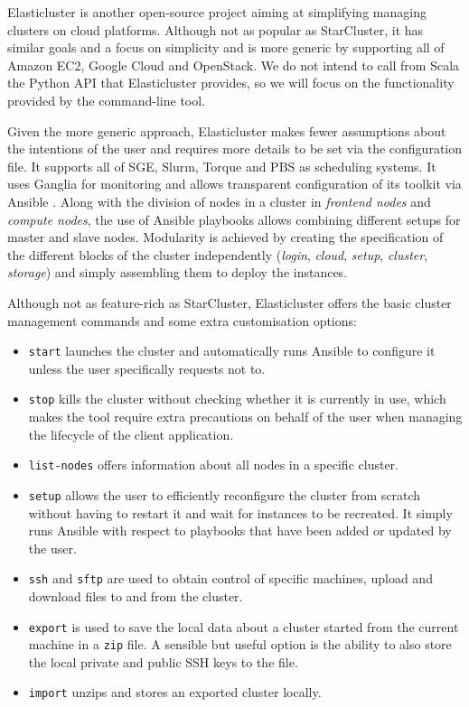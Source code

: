 Elasticluster \cite{Elasticluster} is another open-source project aiming at simplifying managing clusters on cloud platforms. Although not as popular as StarCluster, it has similar goals and a focus on simplicity and is more generic by supporting all of Amazon EC2, Google Cloud and OpenStack. We do not intend to call from Scala the Python API that Elasticluster provides, so we will focus on the functionality provided by the command-line tool.

Given the more generic approach, Elasticluster makes fewer assumptions about the intentions of the user and requires more details to be set via the configuration file. It supports all of SGE, Slurm, Torque and PBS as scheduling systems. It uses Ganglia \cite{Ganglia} for monitoring and allows transparent configuration of its toolkit via Ansible \cite{Ansible}. Along with the division of nodes in a cluster in \textit{frontend nodes} and \textit{compute nodes}, the use of Ansible playbooks allows combining different setups for master and slave nodes. Modularity is achieved by creating the specification of the different blocks of the cluster independently (\textit{login}, \textit{cloud}, \textit{setup}, \textit{cluster}, \textit{storage}) and simply assembling them to deploy the instances.

Although not as feature-rich as StarCluster, Elasticluster offers the basic cluster management commands and some extra customisation options:
\begin{itemize}
	\item \verb|start| launches the cluster and automatically runs Ansible to configure it unless the user specifically requests not to.
	\item \verb|stop| kills the cluster without checking whether it is currently in use, which makes the tool require extra precautions on behalf of the user when managing the lifecycle of the client application.
	\item \verb|list-nodes| offers information about all nodes in a specific cluster.
	\item \verb|setup| allows the user to efficiently reconfigure the cluster from scratch without having to restart it and wait for instances to be recreated. It simply runs Ansible with respect to playbooks that have been added or updated by the user.
	\item \verb|ssh| and \verb|sftp| are used to obtain control of specific machines, upload and download files to and from the 
cluster.
	\item \verb|export| is used to save the local data about a cluster started from the current machine in a \verb|zip| file. A sensible but useful option is the ability to also store the local private and public SSH keys to the file.
	\item \verb|import| unzips and stores an exported cluster locally.
\end{itemize}

